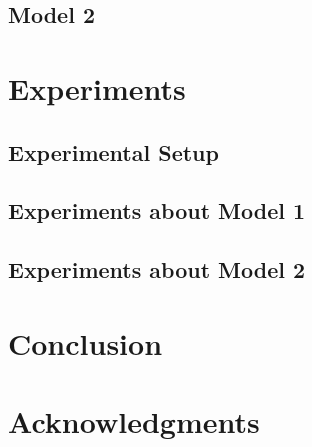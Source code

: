 \documentclass{article}
\begin{document}
\subsection{Model 2}


\section{Experiments}

\subsection{Experimental Setup}

\subsection{Experiments about Model 1}

\subsection{Experiments about Model 2}

\section{Conclusion}



\section*{Acknowledgments}





\end{document}
